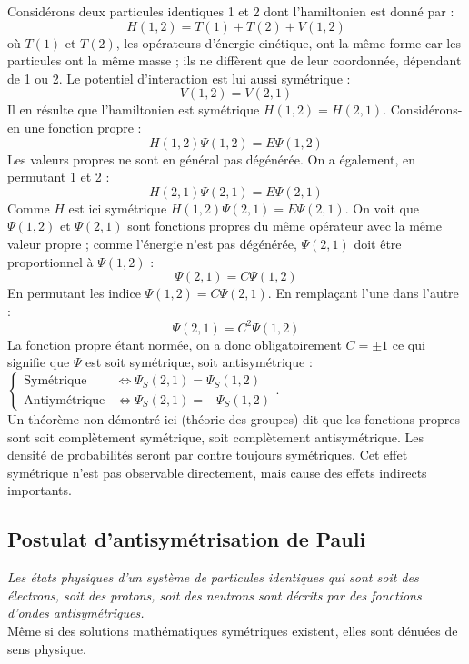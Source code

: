 \documentclass	[11pt, a4paper, openany]{book}
\begin{document}
Considérons deux particules identiques 1 et 2 dont l'hamiltonien est donné par :
\begin{equation}
H(1,2) = T(1)+T(2) + V(1,2)
\end{equation}
où $T(1)$ et $T(2)$, les opérateurs d'énergie cinétique, ont la même forme car les particules ont la même masse ; ils ne diffèrent que de leur coordonnée, dépendant de 1 ou 2. Le potentiel d'interaction est lui aussi symétrique :
\begin{equation}
V(1,2) = V(2,1)
\end{equation}
Il en résulte que l'hamiltonien est symétrique $H(1,2) = H(2,1)$. Considérons-en une fonction propre :
\begin{equation}
H(1,2)\Psi(1,2) = E\Psi(1,2)
\end{equation}
Les valeurs propres ne sont en général pas dégénérée. On a également, en permutant 1 et 2 :
\begin{equation}
H(2,1)\Psi(2,1) = E\Psi(2,1)
\end{equation}
Comme $H$ est ici symétrique $H(1,2)\Psi(2,1) = E\Psi(2,1)$. On voit que $\Psi(1,2)$ et $\Psi(2,1)$ sont fonctions propres du même opérateur avec la même valeur propre ; comme l'énergie n'est pas dégénérée, $\Psi(2,1)$ doit être proportionnel à $\Psi(1,2)$ :
\begin{equation}
\Psi(2,1) = C\Psi(1,2)
\end{equation}
En permutant les indice $\Psi(1,2) = C\Psi(2,1)$. En remplaçant l'une dans l'autre :
\begin{equation}
\Psi(2,1) = C^2\Psi(1,2)
\end{equation}
La fonction propre étant normée, on a donc obligatoirement $C = \pm 1$ ce qui signifie que $\Psi$ est soit symétrique, soit antisymétrique :
$\left\{\begin{array}{ll}
\text{Symétrique} &\Leftrightarrow \Psi_S(2,1) = \Psi_S(1,2)\\
\text{Antiymétrique} &\Leftrightarrow \Psi_S(2,1) = -\Psi_S(1,2)
\end{array}\right.$.\\
Un théorème non démontré ici (théorie des groupes) dit que les fonctions propres sont soit complètement symétrique, soit complètement antisymétrique. Les densité de probabilités seront par contre toujours symétriques. Cet effet symétrique n'est pas observable directement, mais cause des effets indirects importants.

\subsection{Postulat d'antisymétrisation de Pauli}
\textit{Les états physiques d'un système de particules identiques qui sont soit des électrons, soit des protons, soit des neutrons sont décrits par des fonctions d'ondes antisymétriques.}\\
Même si des solutions mathématiques symétriques existent, elles sont dénuées de sens physique.\\
\end{document}
